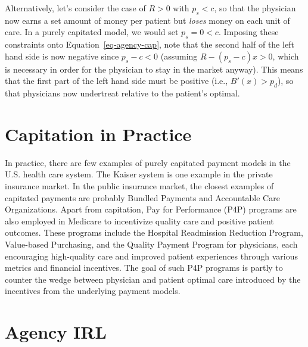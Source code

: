 \documentclass[
  letterpaper,
  DIV=11,
  numbers=noendperiod]{scrreport}
\theoremstyle{definition}
\theoremstyle{remark}
\begin{document}
Alternatively, let's consider the case of \(R>0\) with \(p_{s}<c\), so
that the physician now earns a set amount of money per patient but
\emph{loses} money on each unit of care. In a purely capitated model, we
would set \(p_{s}=0<c\). Imposing these constraints onto
Equation~\ref{eq-agency-cap}, note that the second half of the left hand
side is now negative since \(p_{s}-c<0\) (assuming \(R-(p_{s} -c)x>0\),
which is necessary in order for the physician to stay in the market
anyway). This means that the first part of the left hand side must be
positive (i.e., \(B'(x)>p_{d}\)), so that physicians now undertreat
relative to the patient's optimal.

\hypertarget{capitation-in-practice}{%
\section{Capitation in Practice}\label{capitation-in-practice}}

In practice, there are few examples of purely capitated payment models
in the U.S. health care system. The Kaiser system is one example in the
private insurance market. In the public insurance market, the closest
examples of capitated payments are probably Bundled Payments and
Accountable Care Organizations. Apart from capitation, Pay for
Performance (P4P) programs are also employed in Medicare to incentivize
quality care and positive patient outcomes. These programs include the
Hospital Readmission Reduction Program, Value-based Purchasing, and the
Quality Payment Program for physicians, each encouraging high-quality
care and improved patient experiences through various metrics and
financial incentives. The goal of such P4P programs is partly to counter
the wedge between physician and patient optimal care introduced by the
incentives from the underlying payment models.

\hypertarget{agency-irl}{%
\section{Agency IRL}\label{agency-irl}}
\end{document}
